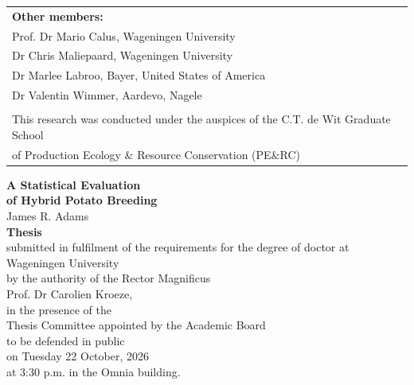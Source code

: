 \begin{tabular}{l}
                                                                                         \\  
    \textbf{Other members:}                                                                   \\  
    Prof. Dr Mario Calus, Wageningen University                                              \\  
    Dr Chris Maliepaard, Wageningen University                                                        \\  
    Dr Marlee Labroo, Bayer, United States of America                                                        \\  
    Dr Valentin Wimmer, Aardevo, Nagele                                                        \\  
                                                                                              \\  

    \small{This research was conducted under the auspices of the C.T. de Wit Graduate School} \\  
    \small{of Production Ecology \& Resource Conservation (PE$\&$RC)}                         \\  
\end{tabular}

\newpage
\thispagestyle{empty}
\begin{center}
\Huge{\textbf{A Statistical Evaluation}} \\
\Huge{\textbf{of Hybrid Potato Breeding}} \\
\vspace*{1cm}
\Large{James R. Adams}\\
\normalsize
\vspace*{\fill}
\textbf{Thesis} \\
submitted in fulfilment of the requirements for the degree of doctor at \\
Wageningen University\\
by the authority of the Rector Magnificus\\
Prof. Dr Carolien Kroeze, \\
in the presence of the\\
Thesis Committee appointed by the Academic Board\\
to be defended in public\\
on Tuesday 22 October, 2026\\
at 3:30 p.m. in the Omnia building.\\
\end{center}

